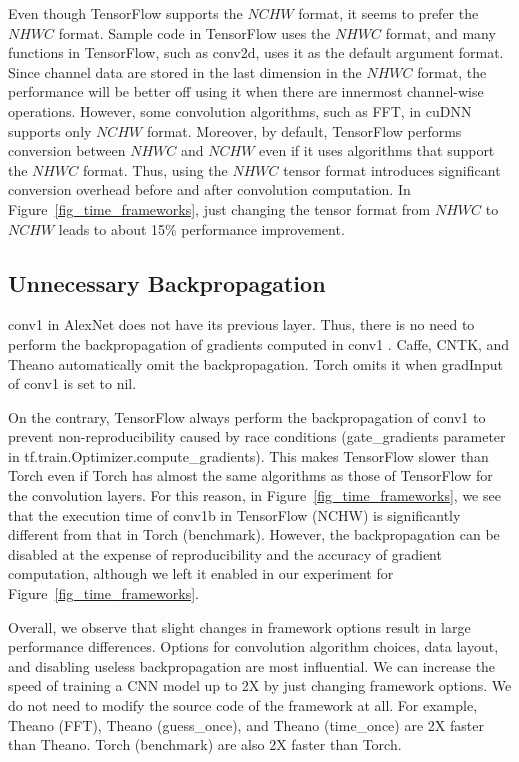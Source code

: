 Even though TensorFlow supports the $NCHW$ format, it seems to prefer the $NHWC$ format. Sample code in TensorFlow uses the $NHWC$ format, and many functions in TensorFlow, such as conv2d, uses it as the default argument format. Since channel data are stored in the last dimension in the $NHWC$ format, the performance will be better off using it when there are innermost channel-wise operations. However, some convolution algorithms, such as FFT, in cuDNN supports only $NCHW$ format. Moreover, by default, TensorFlow performs conversion between $NHWC$ and $NCHW$ even if it uses algorithms that support the $NHWC$ format. Thus, using the $NHWC$ tensor format introduces significant conversion overhead before and after convolution computation. In Figure~\ref{fig_time_frameworks}, just changing the tensor format from $NHWC$ to $NCHW$ leads to about 15\% performance improvement. 

\subsection{Unnecessary Backpropagation}
\textsf{conv1} in AlexNet does not have its previous layer. Thus, there is no need to perform the backpropagation of gradients computed in \textsf{conv1} . Caffe, CNTK, and Theano automatically omit the backpropagation. Torch omits it when \textsf{gradInput} of \textsf{conv1}  is set to nil.

On the contrary, TensorFlow always perform the backpropagation of \textsf{conv1}  to prevent non-reproducibility caused by race conditions (gate\_gradients parameter in tf.train.Optimizer.compute\_gradients). This makes TensorFlow slower than Torch even if Torch has almost the same algorithms as those of TensorFlow for the convolution layers. For this reason, in Figure~\ref{fig_time_frameworks}, we see that the execution time of \textsf{conv1b} in \textsf{TensorFlow (NCHW)} is significantly different from that in \textsf{Torch (benchmark)}. However, the backpropagation can be disabled at the expense of reproducibility and the accuracy of gradient computation, although we left it enabled in our experiment for Figure~\ref{fig_time_frameworks}.


Overall, we observe that slight changes in framework options result in large performance differences. Options for convolution algorithm choices, data layout, and disabling useless backpropagation are most influential. We can increase the speed of training a CNN model up to 2X by just changing framework options. We do not need to modify the source code of the framework at all. For example, \textsf{Theano (FFT)}, \textsf{Theano (guess\_once)}, and \textsf{Theano (time\_once)} are 2X faster than \textsf{Theano}. \textsf{Torch (benchmark)} are also 2X faster than \textsf{Torch}.

